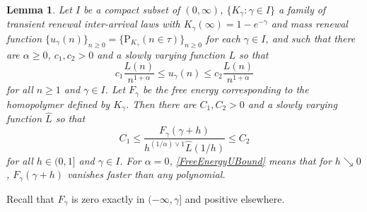 \documentclass[10pt]{amsart}
\newtheorem{lemm}[theo]{Lemma}\newtheorem{prop}[theo]{Proposition}\newtheorem{coro}[theo]{Corollary}\newtheorem{conj}[theo]{Conjecture}
\theoremstyle{definition}\newtheorem{defi}[theo]{Definition}\newtheorem{rema}[theo]{Remark}\newtheorem{exam}[theo]{Example}\newtheorem{exem}[theo]{Example}\newtheorem{nota}[theo]{Notation}
\newcommand{\ga}{\alpha}
\newcommand{\gga}{\gamma}
\newcommand\bP{\ensuremath{\mathrm{P}}}
\begin{document}
\begin{lemm}\label{FreeEnergyU}
Let $I$ be a compact subset of $(0,\infty)$, $\{K_\gga \colon \gga \in I\}$ a family of transient renewal inter-arrival laws with $K_\gga(\infty) = 1 - e^{- \gga}$ and mass renewal function $\{u_\gga(n)\}_{n\ge 0} = \{\bP_{K_\gga}(n\in\tau)\}_{n\ge 0}$ for each $\gga \in I$, and such that there are $\ga \geq 0$, $c_1,c_2 > 0$ and a slowly varying function $L$ so that
\begin{equation}\label{ReturnTimeUBound}
c_1 \frac{L(n)}{n^{1 + \ga}} \leq u_\gga(n) \leq c_2 \frac{L(n)}{n^{1 + \ga}}
\end{equation}
for all $n \geq 1$ and $\gga \in I$. Let $F_\gga$ be the free energy corresponding to the homopolymer defined by $K_\gga$. Then there are $C_1,C_2 > 0$ and a slowly varying function $\hat L$ so that
\begin{equation}\label{FreeEnergyUBound}
C_1 \leq \frac{F_\gga(\gga + h)}{h^{(1/\ga) \vee 1} \hat L(1/h)} \leq C_2
\end{equation}
for all $h \in (0,1]$ and $\gga \in I$. For $\ga = 0$, \eqref{FreeEnergyUBound} means that for $h \searrow 0$, $F_\gga(\gga + h)$ vanishes faster than any polynomial.
\end{lemm}

Recall that $F_\gga$ is zero exactly in $(- \infty,\gga]$ and positive elsewhere.
\end{document}
